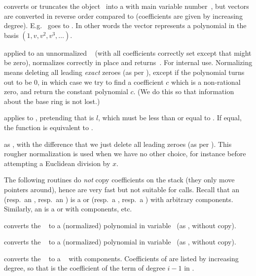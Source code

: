  converts or truncates the object~
into a  with main variable number~, but vectors are converted
in reverse order compared to  (coefficients are given by
increasing degree). E.g.~\kbd{[2,3]} goes to . In other words
the vector represents a polynomial in the basis $(1,v,v^2,v^3,\dots)$.

 applied to an unnormalized ~
(with all coefficients correctly set except that  might
be zero), normalizes  correctly in place and returns~. For
internal use. Normalizing means deleting all leading \emph{exact} zeroes
(as per ), except if the polynomial turns out to be $0$,
in which case we try to find a coefficient $c$ which is a non-rational zero,
and return the constant polynomial $c$. (We do this so that information
about the base ring is not lost.)

 applies  to
, pretending that  is $l$, which must be less than
or equal to . If equal, the function is equivalent to
.

 as ,
with the difference that we just delete all leading zeroes (as per
). This rougher normalization is used when we have no other
choice, for instance before attempting a Euclidean division by $x$.

The following routines do \emph{not} copy coefficients on the stack (they
only move pointers around), hence are very fast but not suitable for
 calls. Recall that an  (resp.~an , resp.~an
) is a  or  (resp.~a , resp.~a )
with arbitrary components. Similarly, an  is a  or
 with  components, etc.

 converts the ~ to a
(normalized) polynomial in variable~ (as , without
copy).

 converts the ~
to a (normalized) polynomial in variable~ (as ,
without copy).

 converts the ~ to a
~ with  components. Coefficients of  are listed
by increasing degree, so that  is the coefficient of the term of
degree $i-1$ in .

